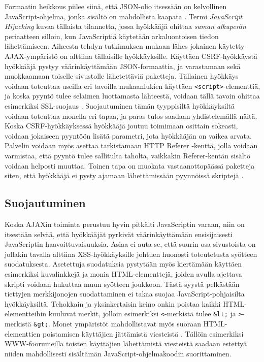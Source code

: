 Formaatin heikkous piilee siinä, että JSON-olio itsessään on
kelvollinen JavaScript-ohjelma, jonka sisältö on mahdollista kaapata
\cite{AJAX}. Termi \emph{JavaScript Hijacking} kuvaa tällaista
tilannetta, jossa hyökkääjä ohittaa \emph{saman alkuperän} periaatteen
silloin, kun JavaScriptiä käytetään arkaluontoisen tiedon
lähettämiseen. Aiheesta tehdyn tutkimuksen \cite{JSH} mukaan lähes
jokainen käytetty AJAX-ympäristö on alttiina tällaisille
hyökkäyksille. Käyttäen CSRF-hyökkäystä hyökkääjä pystyy
väärinkäyttämään JSON-for\-maat\-ti\-a, ja varastamaan sekä muokkaamaan
toiselle sivustolle lähetettäviä paketteja.  Tällainen hyökkäys
voidaan toteuttaa useilla eri tavoilla mukaanlukien käyttäen
\texttt{<script>}-elementtiä, ja koska pyyntö tulee selaimen luottamasta
lähteestä, voidaan tällä tavoin ohittaa esimerkiksi SSL-suojaus
\cite{AJAX}. Suojautuminen tämän tyyppisiltä hyökkäyksiltä voidaan
toteuttaa monella eri tapaa, ja paras tulos saadaan yhdistelemällä
näitä. Koska CSRF-hyök\-käyk\-ses\-sä hyökkääjä joutuu toimimaan osittain
sokeasti, voidaan jokaiseen pyyntöön lisätä parametri, jota hyökkääjän
on vaikea arvata. Palvelin voidaan myös asettaa tarkistamaan HTTP
Referer -kenttä, jolla voidaan varmistaa, että pyyntö tulee sallitulta
taholta, vaikkakin Referer-kentän sisältö voidaan helposti
muuttaa. Toinen tapa on muokata vastaanottopäässä paketteja siten,
että hyökkääjä ei pysty ajamaan lähettämissään pyynnöissä skriptejä
\cite{JSH}.

\subsection{Suojautuminen}

Koska AJAXin toiminta perustuu hyvin pitkälti JavaScriptin varaan,
niin on itsestään selvää, että hyökkääjät pyrkivät väärinkäyttämään
ensisijaisesti JavaScriptin haavoittuvaisuuksia.  Asiaa ei auta se,
että suurin osa sivustoista on jollakin tavalla alttiina
XSS-hyök\-käyk\-sil\-le \cite{WEB2c} johtuen huonosti toteutetusta syötteen
suodatuksesta. Asetettuja suodatuksia pystytään myös kiertämään
käyttäen esimerkiksi kuvalinkkejä ja monia HTML-elementtejä,
joiden avulla ajettava skripti voidaan hukuttaa muun syötteen
joukkoon. Tästä syystä pelkästään tiettyjen merkkijonojen
suodattaminen ei takaa suojaa JavaScript-pohjaisilta
hyökkäyksiltä. Tehokkain ja yksinkertaisin keino onkin poistaa kaikki
HTML-e\-le\-ment\-tei\-hin kuuluvat merkit, jolloin esimerkiksi \texttt{<}-merkistä tulee
\texttt{\&lt;} ja \texttt{>}-merkistä \texttt{\&gt;}. Monet ympäristöt
mahdollistavat myös suoraan HTML-e\-le\-ment\-ti\-en poistamisen käyttäjien
jättämistä viesteistä \cite{AJAX}. Tällöin esimerkiksi WWW-foo\-ru\-meil\-la
toisten käyttäjien lähettämistä viesteistä saadaan estettyä
niiden mahdollisesti sisältämän JavaScript-ohjelmakoodin suorittaminen.

